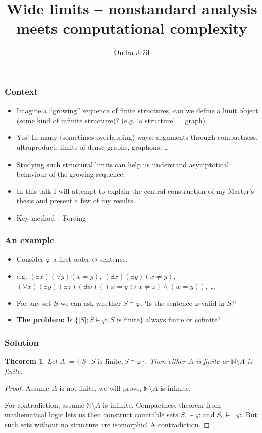 \documentclass{beamer}
\title{Wide limits -- nonstandard analysis meets computational complexity}
\author{Ondra Ježil}
\newcommand{\N}{\mathbb{N}}
\newcommand{\0}{\textbf{0}}
\newcommand{\1}{\textbf{1}}
\newcommand{\abs}[1]{\lvert #1 \rvert}
\newtheorem{thrm}{Theorem}
\begin{document}
\frame{\titlepage}
\begin{frame}
\frametitle{Context}
\begin{itemize}[<+->] 
\item Imagine a ``growing'' sequence of finite structures, can we define a limit object (some kind of infinite structure)? (e.g. `a structure' = graph)
\item Yes! In many (sometimes overlapping) ways: arguments through compactness, ultraproduct, limits of dense graphs, graphons, \dots
\item Studying such structural limits can help us understand asymptotical behaviour of the growing sequence.
\item In this talk I will attempt to explain the central construction of my Master's thesis and present a few of my results. 
\item Key method -- Forcing
\end{itemize}
\end{frame}
\begin{frame}
\frametitle{An example}
\begin{itemize}[<+->] 
\item Consider $\varphi$ a first order $\varnothing$-sentence. 
\item e.g. $(\exists x)(\forall y)(x=y)$, $(\exists x)(\exists y)(x\not = y)$, $(\forall x)(\exists y)(\exists z)(\exists w)((x=y\leftrightarrow x\not = z) \land (w=y))$, \dots
\item For any set $S$ we can ask whether $S\models \varphi$. `Is the sentence $\varphi$ valid in $S$?'
\item \textbf{The problem:} Is $\{\abs{S}; S\models \varphi, S\text{ is finite} \}$ always finite or cofinite?
\end{itemize}
\end{frame}

\begin{frame}
\frametitle{Solution}
\begin{thrm}
Let $A:=\{\abs{S}; S\text{ is finite}, S\models \varphi\}$. Then either $A$ is finite or $\N\setminus A$ is finite.
\end{thrm}
\begin{proof}
Assume $A$ is not finite, we will prove, $\N\setminus A$ is infinite. 

For contradiction, assume $\N\setminus A$ is infinite. Compactness theorem from mathematical logic lets us then construct countable sets $S_1\models \varphi$ and $S_2\models \lnot \varphi$. But such sets without no structure are isomorphic! A contradiction.
\end{proof}
\end{frame}
\end{document}
